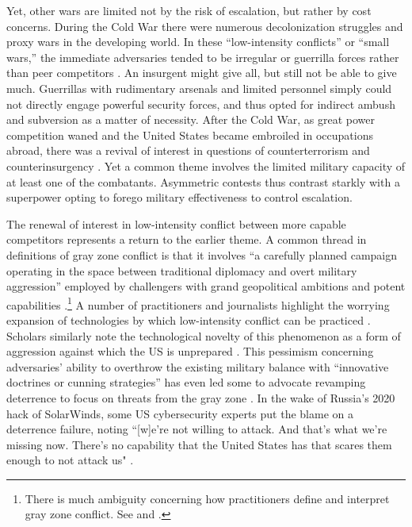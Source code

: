 \documentclass[11pt,letterpaper,pdftex,dvipsnames,table]{article}
\begin{document}
Yet, other wars are limited not by the risk of escalation, but rather by cost concerns. During the Cold War there were numerous decolonization struggles and proxy wars in the developing world. In these “low-intensity conflicts” or “small wars,” the immediate adversaries tended to be irregular or guerrilla forces rather than peer competitors \citep{galula_counterinsurgencywarfaretheory_1964, taber_warfleaclassic_1965, shultz_lowintensitywarfarechallenge_1986}. An insurgent might give all, but still not be able to give much. Guerrillas with rudimentary arsenals and limited personnel simply could not directly engage powerful security forces, and thus opted for indirect ambush and subversion as a matter of necessity. After the Cold War, as great power competition waned and the United States became embroiled in occupations abroad, there was a revival of interest in questions of counterterrorism and counterinsurgency \citep{nagl_learningeatsoup_2005, kilcullen_counterinsurgency_2010}. Yet a common theme involves the limited military capacity of at least one of the combatants. Asymmetric contests thus contrast starkly with a superpower opting to forego military effectiveness to control escalation. 

The renewal of interest in low-intensity conflict between more capable competitors represents a return to the earlier theme. A common thread in definitions of gray zone conflict is that it involves “a carefully planned campaign operating in the space between traditional diplomacy and overt military aggression” employed by challengers with grand geopolitical ambitions and potent capabilities \citep{mazarr_strugglegrayzone_2015}.\footnote{There is much ambiguity concerning how practitioners define and interpret gray zone conflict. See \citet{bragg_integrationreportgray_2017} and \citet{janicatova_ambiguityhybridwarfare_2021}.} A number of practitioners and journalists highlight the worrying expansion of technologies by which low-intensity conflict can be practiced \citep{knefel_grayzonefuture_2015, olson_americanotready_2015, pomerantsev_fightingfriendinggrey_2015, foust_canfancybear_2016, freier_outplayedregainingstrategic_2016}. Scholars similarly note the technological novelty of this phenomenon as a form of aggression against which the US is unprepared \citep{hoffman_conflict21stcentury_2007, thornton_changingnaturemodern_2015, brands_paradoxesgrayzone_2016, jackson_informationnotweapons_2016, santoro_healeywrongit_2016, wirtz_lifegrayzone_2017, hughes_wargreyzone_2020}. This pessimism concerning adversaries' ability to overthrow the existing military balance with ``innovative doctrines or cunning strategies'' \citep[906]{goldstein_uschinanaval_2017} has even led some to advocate revamping deterrence to focus on threats from the gray zone \citep{tor_cumulativedeterrencenew_2015, matisek_shadesgraydeterrence_2017, hicks_othermeanspart_2019, pettyjohn_competinggrayzone_2019}. In the wake of Russia's 2020 hack of SolarWinds, some US cybersecurity experts put the blame on a deterrence failure, noting  ``[w]e're not willing to attack. And that's what we're missing now. There's no capability that the United States has that scares them enough to not attack us" \citep{croxton_cybersecurityexpertssay_2021}.
\end{document}
